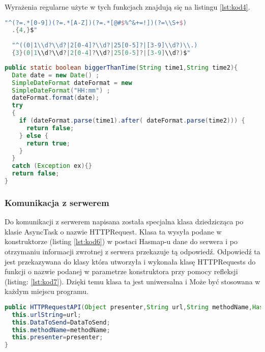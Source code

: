 	Wyrażenia regularne użyte w tych funkcjach znajdują się na listingu \ref{lst:kod4}.
	
	\begin{lstlisting}[caption={Wyrażenia regularne.}, label={lst:kod4}, language=Kotlin]
  "^(?=.*[0-9])(?=.*[A-Z])(?=.*[@#$%^&+=!])(?=\\S+$)
  .{4,}$"
 
  "^((0|1\\d?\\d?|2[0-4]?\\d?|25[0-5]?|[3-9]\\d?)\\.)
  {3}(0|1\\d?\\d?|2[0-4]?\\d?|25[0-5]?|[3-9]\\d?)$"
		\end{lstlisting}

	\begin{lstlisting}[caption={Funkcja odpowiedzialna za sprawdzanie, która data jest pó"zniejsza.}, label={lst:kod5}, language=Java]
public static boolean biggerThanTime(String time1,String time2){
  Date date = new Date() ;
  SimpleDateFormat dateFormat = new 
  SimpleDateFormat("HH:mm") ;
  dateFormat.format(date);
  try 
  {
    if (dateFormat.parse(time1).after( dateFormat.parse(time2))) {
      return false;
    } else {
      return true;
    }
  }
  catch (Exception ex){}	
  return false;
}
	\end{lstlisting}
	
	\newpage
	\subsubsection{Komunikacja z serwerem}
	Do komunikacji z serwerem napisana została specjalna klasa dziedzicząca po klasie AsyncTask o nazwie HTTPRequest. Klasa ta wysyła podane w konstruktorze (listing \ref{lst:kod6}) w postaci Hasmap-u dane do serwera i po otrzymaniu informacji zwrotnej z serwera przekazuje tą odpowiedź. Odpowiedź ta jest przekazywana do klasy która utworzyła i wykonała klasę HTTPRequests do funkcji o nazwie podanej w parametrze konstruktora przy pomocy refleksji (listing: \ref{lst:kod7}). Dzięki temu klasa ta jest uniwersalna i Może być stosowana w każdym miejscu programu.
	
	\begin{lstlisting}[caption={Konstruktor klasy HTTPRequest.}, label={lst:kod6}, language=Java]
public HTTPRequestAPI(Object presenter,String url,String methodName,HashMap DataToSend) {
  this.urlString=url;
  this.DataToSend=DataToSend;
  this.methodName=methodName;
  this.presenter=presenter;
}
\end{lstlisting}	
	
